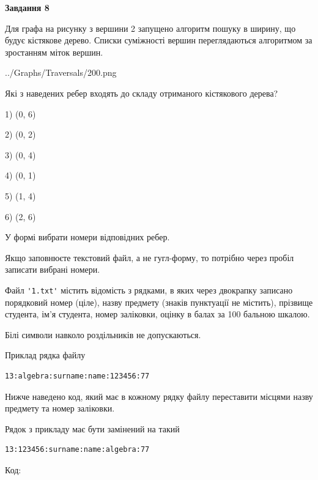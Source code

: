 \documentclass[12pt, ukrainian]{article}
\def\code#1{\Verb!#1!}
\begin{document}
{\begin {large}
{\begin {center}\textbf{Завдання 8}\end {center}}\par
Для графа на рисунку з вершини 2 запущено алгоритм пошуку в ширину, що будує кістякове дерево. Списки суміжності вершин переглядаються алгоритмом за зростанням міток вершин.\par
\begin{center}
	{../Graphs/Traversals/200.png}
\end{center}
\par Які з наведених ребер входять до складу отриманого кістякового дерева?\par
1) (0, 6)\par
2) (0, 2)\par
3) (0, 4)\par
4) (0, 1)\par
5) (1, 4)\par
6) (2, 6)\par
{\vskip 15pt} У формі вибрати номери відповідних ребер.


Якщо заповнюєте текстовий файл, а не гугл-форму, то потрібно через пробіл записа\-ти вибрані номери.\par
\newpage


Файл \code{'1.txt'} містить відомість з рядками, в яких через двокрапку записано поряд\-ковий номер (ціле), назву предмету (знаків пунктуації не містить), прізвище студента, ім'я студента, номер заліковки, оцінку в балах за 100 бальною шкалою.

Білі символи навколо роздільників не допускаються.

Приклад рядка файлу



\begin{verbatim}
13:algebra:surname:name:123456:77
\end{verbatim}


Нижче наведено код, який має в кожному рядку файлу переставити місцями назву предмету та номер заліковки.

Рядок з прикладу має бути замінений на такий



\begin{verbatim}
13:123456:surname:name:algebra:77
\end{verbatim}




Код:




\end{large}}
\end{document}
